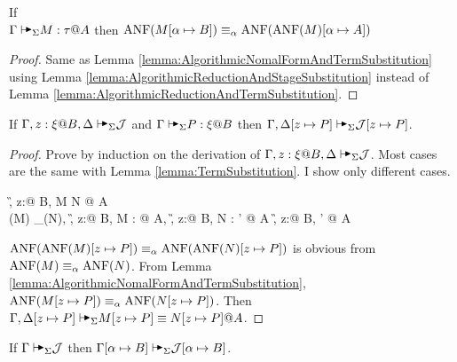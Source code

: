 \begin{lemma}
    \label{lemma:AlgorithmicNomalFormAndStageSubstitution}
    If \\ \( \G \AVS M : \tau @ A \) then
    \( \text{ANF}(M[\alpha \mapsto B]) \equiv_\alpha \text{ANF}(\text{ANF}(M)[\alpha \mapsto A]) \)
\end{lemma}

\begin{proof}
    Same as Lemma \ref{lemma:AlgorithmicNomalFormAndTermSubstitution} using
    Lemma \ref{lemma:AlgorithmicReductionAndStageSubstitution} instead of Lemma
    \ref{lemma:AlgorithmicReductionAndTermSubstitution}.
\end{proof}

\begin{lemma}
    \label{lemma:TermSubstitutionLemmaOfAlgorithmicJudgement}
    If $\G, z:\xi@B, \D \AVS \mathcal{J}$ and $\G\AVS P:\xi @B$ then $\G, \D[z \mapsto P] \AVS \mathcal{J}[z \mapsto P]$.
\end{lemma}

\begin{proof}
    Prove by induction on the derivation of \( \G, z:\xi@B, \D \AVS \mathcal{J}
    \). Most cases are the same with Lemma \ref{lemma:TermSubstitution}. I show
    only different cases.

    \begin{rneqncase}{\QAANF}{
            \G, z:\xi @ B, \D \AVS M \E N @ A
             \\
            \ANF(M) \E_\alpha \ANF(N),
            \G, z:\xi @ B, \D \AVS M : \tau @ A,
            \G, z:\xi @ B, \D \AVS N : \tau' @ A 
            \G, z:\xi @ B, \D \AVS \tau \E \tau' @ A
        }
    \end{rneqncase}
    \( \text{ANF}(\text{ANF}(M)[z \mapsto P]) \equiv_\alpha \text{ANF}(\text{ANF}(N)[z \mapsto P]) \) is obvious from \( \text{ANF}(M) \equiv_\alpha \text{ANF}(N) \).
    From Lemma \ref{lemma:AlgorithmicNomalFormAndTermSubstitution}, \( \text{ANF}(M[z \mapsto P]) \equiv_\alpha \text{ANF}(N[z \mapsto P]) \).
    Then \( \G, \D[z \mapsto P] \AVS M[z \mapsto P] \E N[z \mapsto P] @ A \).
\end{proof}

\begin{lemma}
    \label{lemma:StageSubstitutionLemmaofAlgorithmicJudgement}
    If $\G \AVS \mathcal{J}$ then $\G[\alpha \mapsto B] \AVS \mathcal{J}[\alpha \mapsto B]$.
\end{lemma}

